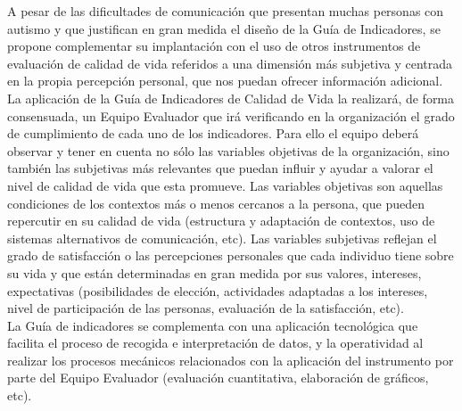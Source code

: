 \begin{itemize}
	A pesar de las dificultades de comunicación que presentan muchas personas
	con autismo y que justifican en gran medida el diseño de la Guía de
	Indicadores, se propone complementar su implantación con el uso de otros
	instrumentos de evaluación de calidad de vida referidos a una dimensión más
	subjetiva y centrada en la propia percepción personal, que nos puedan
	ofrecer información adicional. 
	\\
 
	La aplicación de la Guía de Indicadores de Calidad de Vida la realizará, de
	forma consensuada, un Equipo Evaluador que irá verificando en la organización el
	grado de cumplimiento de cada uno de los indicadores. Para ello el equipo deberá
	observar y tener en cuenta no sólo las variables objetivas de la organización,
	sino también las subjetivas más relevantes que puedan influir y ayudar a valorar
	el nivel de calidad de vida que esta promueve. Las variables objetivas son
	aquellas condiciones de los contextos más o menos cercanos a la persona, que
	pueden repercutir en su calidad de vida (estructura y adaptación de contextos,
	uso de sistemas alternativos de comunicación, etc). Las variables subjetivas
	reflejan el grado de satisfacción o las percepciones personales que cada
	individuo tiene sobre su vida y que están determinadas en gran medida por sus
	valores, intereses, expectativas (posibilidades de elección, actividades
	adaptadas a los intereses, nivel de participación de las personas, evaluación de
	la satisfacción, etc).
	\\
	La Guía de indicadores se complementa con una aplicación tecnológica que
	facilita el proceso de recogida e interpretación de datos, y la operatividad al
	realizar los procesos mecánicos relacionados con la aplicación del instrumento
	por parte del Equipo Evaluador (evaluación cuantitativa, elaboración de
	gráficos, etc). 

\end{itemize}

